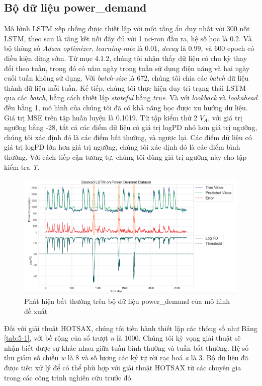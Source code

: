 \subsection{Bộ dữ liệu power\_demand}
Mô hình LSTM xếp chồng được thiết lập với một tầng ẩn duy nhất với 300 nốt LSTM, theo sau là tầng kết nối đầy đủ với 1 nơ-ron đầu ra, hệ số học là 0.2. Và bộ thông số \textit{Adam optimizer}, \textit{learning-rate} là 0.01, \textit{decay} là 0.99, và 600 epoch có điều kiện dừng sớm. Từ mục 4.1.2, chúng tôi nhận thấy dữ liệu có chu kỳ thay đổi theo tuần, trong đó có năm ngày trong tuần sử dụng điện năng và hai ngày cuối tuần không sử dụng. Với \textit{batch-size} là 672, chúng tôi chia các \textit{batch} dữ liệu thành dữ liệu mỗi tuần. Kế tiếp, chúng tôi thực hiện duy trì trạng thái LSTM qua các \textit{batch}, bằng cách thiết lập \textit{stateful} bằng \textit{true}. Và với \textit{lookback} và \textit{lookahead} đều bằng 1, mô hình của chúng tôi đã có khả năng học được xu hướng dữ liệu. Giá trị MSE trên tập huấn luyện là 0.1019. Từ tập kiểm thử 2 $V_{A}$, với giá trị ngưỡng bằng -28, tất cả các điểm dữ liệu có giá trị logPD nhỏ hơn giá trị ngưỡng, chúng tôi xác định đó là các điểm bất thường, và ngược lại. Các điểm dữ liệu có giá trị logPD lớn hơn giá trị ngưỡng, chúng tôi xác định đó là các điểm bình thường. Với cách tiếp cận tương tự, chúng tôi dùng giá trị ngưỡng này cho tập kiểm tra \textit{T}.

\begin{figure}[H]
    \centering
    \includegraphics[scale=1]{./content/images/5-5.png}
    \caption{Phát hiện bất thường trên bộ dữ liệu power\_demand của mô hình đề xuất}
    \label{fig:5-5}
\end{figure}

Đối với giải thuật HOTSAX, chúng tôi tiến hành thiết lập các thông số như Bảng \ref{tab:5-1}, với bề rộng của sổ trượt \textit{n} là 1000. Chúng tôi kỳ vọng giải thuật sẽ nhận biết được sự khác nhau giữa tuần bình thường và tuần bất thường. Hệ số thu giảm số chiều \textit{w} là 8 và số lượng các ký tự rời rạc hoá \textit{a} là 3. Bộ dữ liệu đã được tiền xử lý để có thể phù hợp với giải thuật HOTSAX từ các chuyên gia trong các công trình nghiên cứu trước đó.

